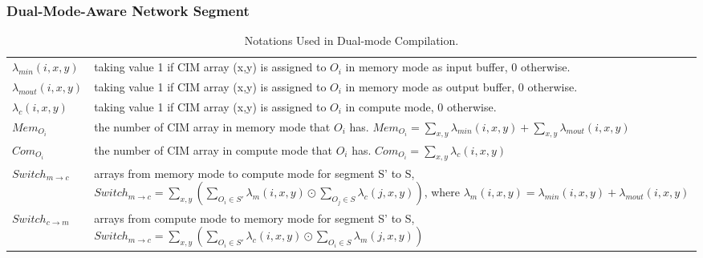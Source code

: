 \subsubsection{Dual-Mode-Aware Network Segment}
\begin{table}[]
\caption{Notations Used in Dual-mode Compilation.}
    \label{tab:not}
\resizebox{\linewidth}{!}
{

\begin{tabular}{l|l}
\hline
          \rowcolor{mygray}\multicolumn{2}{c}{Variables - decide during optimization} \\ \hline
         $\lambda_{min}(i,x,y)$ &  \parbox[t]{9cm}{taking value 1 if CIM array (x,y) is assigned to $O_i$ in memory mode as input buffer, 0 otherwise.}       \\ \hline
         $\lambda_{mout}(i,x,y)$ &  \parbox[t]{9cm}{taking value 1 if CIM array (x,y) is assigned to $O_i$ in memory mode as output buffer, 0 otherwise.}       \\ \hline
         $\lambda_{c}(i,x,y)$ & \parbox[t]{9cm}{taking value 1 if CIM array (x,y) is assigned to $O_i$ in compute mode, 0 otherwise.}        \\ \hline
         $Mem_{O_i}$ & \parbox[t]{9cm}{the number of CIM array in memory mode that $O_i$ has. $Mem_{O_i} = \textstyle\sum_{x,y} \lambda_{min}(i,x,y)+\sum_{x,y} \lambda_{mout}(i,x,y)$ } \\ \hline
         $Com_{O_i}$ & \parbox[t]{9cm}{the number of CIM array in compute mode that $O_i$ has. $Com_{O_i} =\textstyle\sum_{x,y} \lambda_{c}(i,x,y)$}        \\ \hline
         $Switch_{m\to c}$ & \parbox[t]{9cm}{arrays from memory mode to compute mode for segment S' to S, $Switch_{m\to c} =\textstyle \sum_{x,y}(\sum_{O_i \in S'}\lambda_{m}(i,x,y) \odot \sum_{O_j \in S}\lambda_{c}(j,x,y))$, where $\lambda_{m}(i,x,y)=\lambda_{min}(i,x,y)+\lambda_{mout}(i,x,y)$}        \\ \hline
         $Switch_{c\to m}$ & \parbox[t]{9cm}{arrays from compute mode to memory mode for segment S' to S, $Switch_{m\to c} =\textstyle \sum_{x,y}(\textstyle\sum_{O_i \in S'}\lambda_{c}(i,x,y) \odot \textstyle\sum_{O_i \in S}\lambda_{m}(j,x,y))$}        \\ \hline

\end{tabular}}
\end{table}
